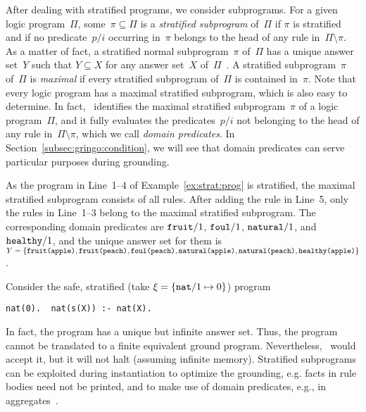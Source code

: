 After dealing with stratified programs, we consider subprograms.
For a given logic program~$\Pi$, some~$\pi\subseteq\Pi$ is a 
\emph{stratified subprogram} of~$\Pi$ if
$\pi$ is stratified and if
no predicate~$p/i$ occurring in~$\pi$ belongs to the head of any rule in~$\Pi\setminus\pi$.
As a matter of fact,
a stratified normal subprogram~$\pi$ of~$\Pi$ has a unique answer set~$Y$ such that
$Y\subseteq X$ for any answer set~$X$ of~$\Pi$~\cite{liftur94a}.
A stratified subprogram~$\pi$ of~$\Pi$ is \emph{maximal} if every stratified
subprogram of~$\Pi$ is contained in~$\pi$.
Note that every logic program has a maximal stratified subprogram,
which is also easy to determine.
In fact, \gringo\ identifies the maximal stratified subprogram~$\pi$
of a logic program~$\Pi$,
and it fully evaluates the predicates~$p/i$ not belonging to the head of any rule in~$\Pi\setminus\pi$,
which we call \emph{domain predicates}.
In Section~\ref{subsec:gringo:condition},
we will see that domain predicates can serve particular purposes during grounding.

\begin{example}\label{ex:strat:max}
As the program in Line~1--4 of Example~\ref{ex:strat:prog} is stratified,
the maximal stratified subprogram consists of all rules.
After adding the rule in Line~5,
only the rules in Line~1--3 belong to the maximal stratified subprogram.
The corresponding domain predicates are
$\texttt{fruit}/1$,
$\texttt{foul}/1$,
$\texttt{natural}/1$, and
$\texttt{healthy}/1$, 
and the unique answer set for them is
$
Y
=
\{
\code{\pred{fruit}(\const{apple})},\linebreak[1]
\code{\pred{fruit}(\const{peach})},\linebreak[1]
\code{\pred{foul}(\const{peach})},\linebreak[1]
\code{\pred{natural}(\const{apple})},\linebreak[1]
\code{\pred{natural}(\const{peach})},\linebreak[1]
\code{\pred{healthy}(\const{apple})}
\}
$.
\eexample
\end{example}

Consider the safe, stratified (take $\xi=\{\texttt{nat}/1 \mapsto 0\}$) program
\begin{lstlisting}[numbers=none]
nat(0).  nat(s(X)) :- nat(X).
\end{lstlisting}
In fact, the program has a unique but infinite answer set.
Thus,
the program cannot be translated to a finite equivalent ground program.
Nevertheless, \gringo\ would accept it, but it will not halt (assuming infinite memory).
Stratified subprograms can be exploited during instantiation
to optimize the grounding, e.g. facts in rule bodies need not be printed, and to make use of domain predicates, e.g., in aggregates~.

